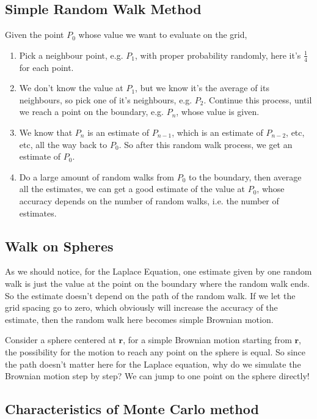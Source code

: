 \documentclass[aps, prl, reprint, groupedaddress]{revtex4-1}
\begin{document}
\subsection{Simple Random Walk Method}

Given the point $P_0$ whose value we want to evaluate on the grid,
\begin{enumerate}
    \item Pick a neighbour point, e.g. $P_1$, with proper probability randomly, here it's $\frac{1}{4}$ for each point.
    \item We don't know the value at $P_1$, but we know it's the average of its neighbours, so pick one of it's neighbours, e.g. $P_2$. Continue this process, until we reach a point on the boundary, e.g. $P_n$, whose value is given.
    \item We know that $P_n$ is an estimate of $P_{n-1}$, which is an estimate of $P_{n-2}$, etc, etc, all the way back to $P_0$. So after this random walk process, we get an estimate of $P_0$.
    \item Do a large amount of random walks from $P_0$ to the boundary, then average all the estimates, we can get a good estimate of the value at $P_0$, whose accuracy depends on the number of random walks, i.e. the number of estimates.
\end{enumerate}


\subsection{Walk on Spheres}

As we should notice, for the Laplace Equation, one estimate given by one random walk is just the value at the point on the boundary where the random walk ends. So the estimate doesn't depend on the path of the random walk. If we let the grid spacing go to zero, which obviously will increase the accuracy of the estimate, then the random walk here becomes simple Brownian motion.

Consider a sphere centered at $\bm{r}$, for a simple Brownian motion starting from $\bm{r}$, the possibility for the motion to reach any point on the sphere is equal. So since the path doesn't matter here for the Laplace equation, why do we simulate the Brownian motion step by step? We can jump to one point on the sphere directly!


\subsection{Characteristics of Monte Carlo method}
\end{document}
